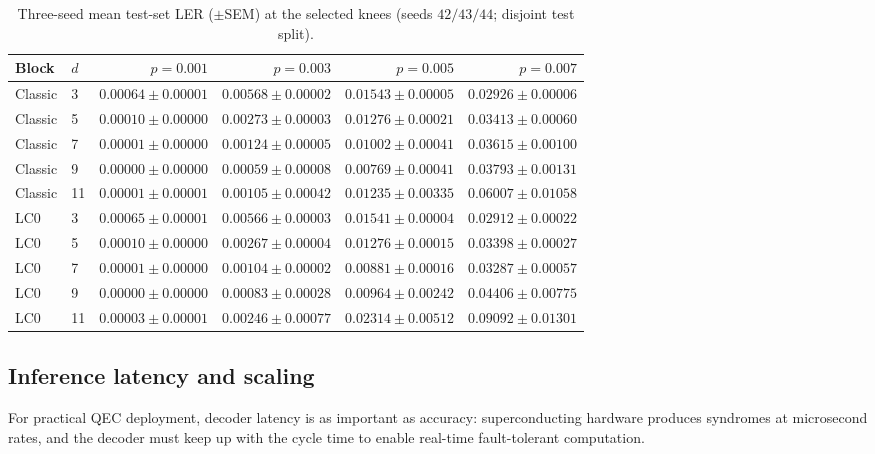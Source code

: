 \documentclass[11pt,a4paper]{article}
\begin{document}
\begin{table}[htbp]
\centering
\caption{Three-seed mean test-set LER ($\pm$SEM) at the selected knees
(seeds $42/43/44$; disjoint test split).}
\label{tab:ler-full}
\small
\begin{tabular}{@{}llrrrr@{}}
\toprule
Block & $d$ & $p{=}0.001$ & $p{=}0.003$ & $p{=}0.005$ & $p{=}0.007$ \\
\midrule
Classic & 3  & $0.00064{\pm}0.00001$ & $0.00568{\pm}0.00002$ & $0.01543{\pm}0.00005$ & $0.02926{\pm}0.00006$ \\
Classic & 5  & $0.00010{\pm}0.00000$ & $0.00273{\pm}0.00003$ & $0.01276{\pm}0.00021$ & $0.03413{\pm}0.00060$ \\
Classic & 7  & $0.00001{\pm}0.00000$ & $0.00124{\pm}0.00005$ & $0.01002{\pm}0.00041$ & $0.03615{\pm}0.00100$ \\
Classic & 9  & $0.00000{\pm}0.00000$ & $0.00059{\pm}0.00008$ & $0.00769{\pm}0.00041$ & $0.03793{\pm}0.00131$ \\
Classic & 11 & $0.00001{\pm}0.00001$ & $0.00105{\pm}0.00042$ & $0.01235{\pm}0.00335$ & $0.06007{\pm}0.01058$ \\
\midrule
LC0 & 3  & $0.00065{\pm}0.00001$ & $0.00566{\pm}0.00003$ & $0.01541{\pm}0.00004$ & $0.02912{\pm}0.00022$ \\
LC0 & 5  & $0.00010{\pm}0.00000$ & $0.00267{\pm}0.00004$ & $0.01276{\pm}0.00015$ & $0.03398{\pm}0.00027$ \\
LC0 & 7  & $0.00001{\pm}0.00000$ & $0.00104{\pm}0.00002$ & $0.00881{\pm}0.00016$ & $0.03287{\pm}0.00057$ \\
LC0 & 9  & $0.00000{\pm}0.00000$ & $0.00083{\pm}0.00028$ & $0.00964{\pm}0.00242$ & $0.04406{\pm}0.00775$ \\
LC0 & 11 & $0.00003{\pm}0.00001$ & $0.00246{\pm}0.00077$ & $0.02314{\pm}0.00512$ & $0.09092{\pm}0.01301$ \\
\bottomrule
\end{tabular}
\end{table}

\subsection{Inference latency and scaling}

For practical QEC deployment, decoder latency is as important as
accuracy: superconducting hardware produces syndromes at microsecond
rates, and the decoder must keep up with the cycle time to enable
real-time fault-tolerant computation.
\end{document}
